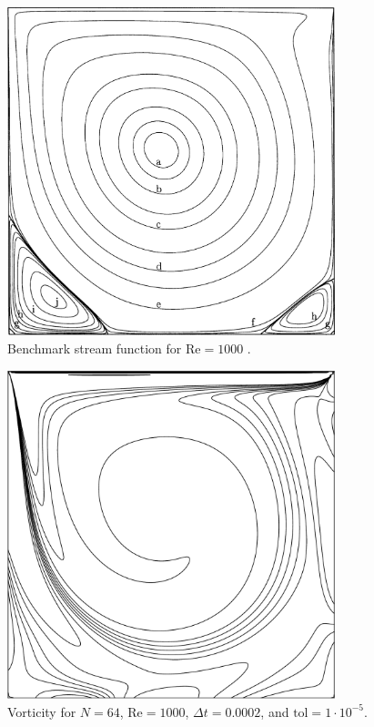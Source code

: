 \begin{figure}[p]
    \centering
    \includegraphics[width=0.85\textwidth]{Images/streamFunction.png}
    \caption{Benchmark stream function for $\text{Re} = 1000$ \parencite{botella1998benchmark}.}
    \label{fig:benchmarkSFN64}
\end{figure}

\begin{figure}[p]
    \centering
    \includegraphics[width=0.85\textwidth]{Images/vorticity.pdf}
    \caption{Vorticity for $N = 64$, $\text{Re} = 1000$, $\Delta t = 0.0002$, and $\text{tol} = 1 \cdot 10^{-5}$.}
    \label{fig:VN64}
\end{figure}

